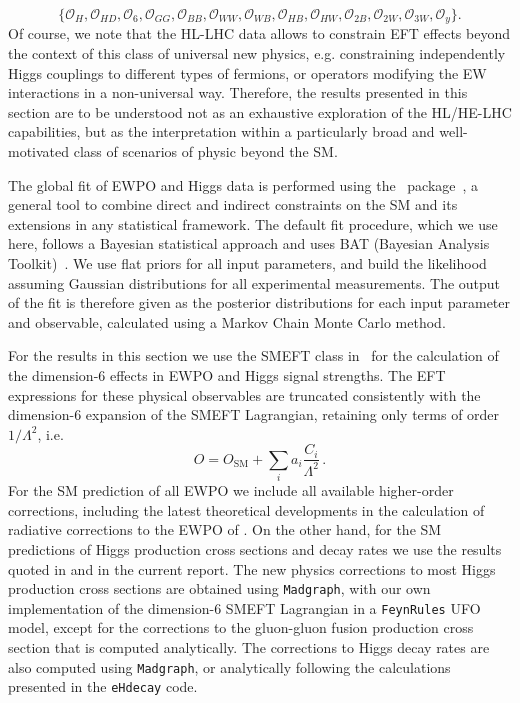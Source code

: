 %
\begin{equation}
\label{eq:universal}
%
\{\mathcal{O}_{H}, \mathcal{O}_{H D} ,
\mathcal{O}_{6} ,
\mathcal{O}_{G G} ,
\mathcal{O}_{B B} ,
\mathcal{O}_{W W} ,
\mathcal{O}_{W B} ,
\mathcal{O}_{HB} ,
\mathcal{O}_{HW} ,
\mathcal{O}_{2B} ,
\mathcal{O}_{2W} ,
\mathcal{O}_{3W} ,
\mathcal{O}_{y} \}.
\end{equation}
%
Of course, we note that the HL-LHC data allows to constrain EFT effects beyond the context of this class of universal new physics, 
e.g. constraining independently Higgs couplings to different types of fermions, or operators modifying the EW interactions
in a non-universal way. Therefore, the results presented in this section are to be understood not as an exhaustive exploration 
of the HL/HE-LHC capabilities, but as the interpretation within a particularly broad and well-motivated class
of scenarios of physic beyond the SM.


The global fit of EWPO and Higgs data is performed using the
\HEPfit~package~\cite{hepfitsite}, a general tool to combine direct
and indirect constraints on the SM and its extensions in any
statistical framework.  The default fit procedure, which we use here,
follows a Bayesian statistical approach and uses BAT (Bayesian
Analysis Toolkit)~\cite{Caldwell:2008fw}. We use flat priors for all
input parameters, and build the likelihood assuming Gaussian
distributions for all experimental measurements. The output of the fit
is therefore given as the posterior distributions for each input
parameter and observable, calculated using a Markov Chain Monte
Carlo method.

For the results in this section we use the SMEFT class in \HEPfit~for 
the calculation of the dimension-6 effects in EWPO and Higgs signal strengths.
The EFT expressions for these physical observables are truncated
consistently with the dimension-6 expansion of the SMEFT Lagrangian, 
retaining only terms of order
$1/\Lambda^2$, i.e.
%
\begin{equation}
O=O_{\mathrm{SM}} + \sum_i a_i \frac{C_i}{\Lambda^2}\,.
\end{equation}
%
For the SM prediction of
all EWPO we include all available higher-order corrections, including the latest
theoretical developments in the calculation of radiative corrections
to the EWPO of \cite{Dubovyk:2016aqv,Dubovyk:2018rlg}.
On the other hand,  for the SM predictions of
Higgs production cross sections and decay rates we use the results
quoted in \cite{deFlorian:2016spz} and in the current report. 
The new physics corrections to most
Higgs production cross sections are obtained using {\tt Madgraph},
with our own implementation of the dimension-6 SMEFT Lagrangian in a
{\tt FeynRules} UFO model, except for the corrections to the
gluon-gluon fusion production cross section that is computed
analytically. The corrections to Higgs decay rates are
also computed using {\tt Madgraph}, or analytically following
the calculations presented in the {\tt eHdecay} code.

